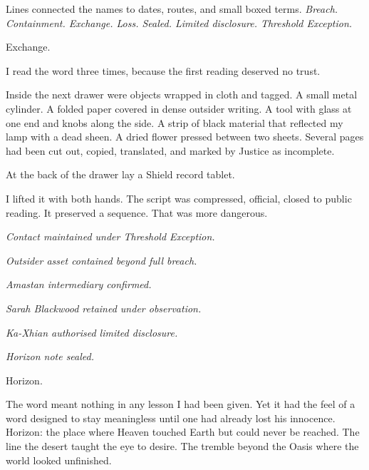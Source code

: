 Lines connected the names to dates, routes, and small boxed terms. \textit{Breach. Containment. Exchange. Loss. Sealed. Limited disclosure. Threshold Exception.}\par

Exchange.\par

I read the word three times, because the first reading deserved no trust.\par

Inside the next drawer were objects wrapped in cloth and tagged. A small metal cylinder. A folded paper covered in dense outsider writing. A tool with glass at one end and knobs along the side. A strip of black material that reflected my lamp with a dead sheen. A dried flower pressed between two sheets. Several pages had been cut out, copied, translated, and marked by Justice as incomplete.\par

At the back of the drawer lay a Shield record tablet.\par

I lifted it with both hands. The script was compressed, official, closed to public reading. It preserved a sequence. That was more dangerous.\par

\textit{Contact maintained under Threshold Exception.}\par

\textit{Outsider asset contained beyond full breach.}\par

\textit{Amastan intermediary confirmed.}\par

\textit{Sarah Blackwood retained under observation.}\par

\textit{Ka-Xhian authorised limited disclosure.}\par

\textit{Horizon note sealed.}\par

Horizon.\par

The word meant nothing in any lesson I had been given. Yet it had the feel of a word designed to stay meaningless until one had already lost his innocence. Horizon: the place where Heaven touched Earth but could never be reached. The line the desert taught the eye to desire. The tremble beyond the Oasis where the world looked unfinished.\par

